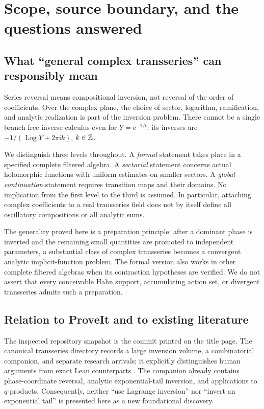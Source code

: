 \documentclass[11pt,a4paper]{article}
\numberwithin{equation}{section}
\theoremstyle{definition}\newtheorem{definition}[theorem]{Definition}
\theoremstyle{remark}\newtheorem{remark}[theorem]{Remark}
\newcommand{\ii}{\mathrm i}\newcommand{\e}{\mathrm e}
\newcommand{\Log}{\operatorname{Log}}\newcommand{\Li}{\operatorname{Li}}
\begin{document}
\section{Scope, source boundary, and the questions answered}
\label{sec:scope}

\subsection{What ``general complex transseries'' can responsibly mean}
Series reversal means compositional inversion, not reversal of the order of
coefficients. Over the complex plane, the choice of sector, logarithm,
ramification, and analytic realization is part of the inversion problem.
There cannot be a single branch-free inverse calculus even for
$Y=\e^{-1/t}$: its inverses are
$-1/(\Log Y+2\pi\ii k)$, $k\in\mathbb Z$.

We distinguish three levels throughout. A \emph{formal} statement takes
place in a specified complete filtered algebra. A \emph{sectorial}
statement concerns actual holomorphic functions with uniform estimates on
smaller sectors. A \emph{global continuation} statement requires transition
maps and their domains. No implication from the first level to the third
is assumed. In particular, attaching complex coefficients to a real
transseries field does not by itself define all oscillatory compositions
or all analytic sums.

The generality proved here is a preparation principle: after a dominant
phase is inverted and the remaining small quantities are promoted to
independent parameters, a substantial class of complex transseries becomes
a convergent analytic implicit-function problem. The formal version also
works in other complete filtered algebras when its contraction hypotheses
are verified. We do not assert that every conceivable Hahn support,
accumulating action set, or divergent transseries admits such a preparation.

\subsection{Relation to ProveIt and to existing literature}
The inspected repository snapshot is the commit printed on the title page.
The canonical transseries directory records a large inversion volume,
a combinatorial companion, and separate research arrivals; it explicitly
distinguishes human arguments from exact Lean counterparts
\cite{repo}. The companion already contains phase-coordinate reversal,
analytic exponential-tail inversion, and applications to $q$-products.
Consequently, neither ``use Lagrange inversion'' nor ``invert an exponential
tail'' is presented here as a new foundational discovery.
\end{document}
